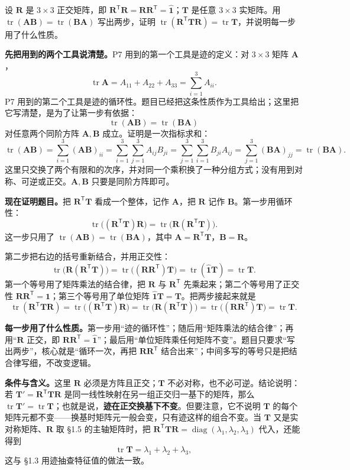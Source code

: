 \documentclass[11pt]{ctexart}
\newcommand{\ten}[1]{\mathbf{#1}}
\newcommand{\unitd}{\hat{\ten{1}}}
\newcommand{\tr}{\operatorname{tr}}
\begin{document}
{设 $\ten R$ 是 $3\times3$ 正交矩阵，即 $\ten R^{\mathsf T}\ten R=\ten R\ten R^{\mathsf T}=\unitd$；$\ten T$ 是任意 $3\times3$ 实矩阵。用 $\tr(\ten A\ten B)=\tr(\ten B\ten A)$ 写出两步，证明 $\tr(\ten R^{\mathsf T}\ten T\ten R)=\tr\ten T$，并说明每一步用了什么性质。}

\textbf{先把用到的两个工具说清楚。}P7 用到的第一个工具是迹的定义：对 $3\times3$ 矩阵 $\ten A$，
\[
\tr\ten A=A_{11}+A_{22}+A_{33}=\sum_{i=1}^{3}A_{ii}.
\]
P7 用到的第二个工具是迹的循环性。题目已经把这条性质作为工具给出；这里把它写清楚，是为了让第一步有依据：
\[
\tr(\ten A\ten B)=\tr(\ten B\ten A)
\]
对任意两个同阶方阵 $\ten A,\ten B$ 成立。证明是一次指标求和：
\[
\tr(\ten A\ten B)
=\sum_{i=1}^{3}(\ten A\ten B)_{ii}
=\sum_{i=1}^{3}\sum_{j=1}^{3}A_{ij}B_{ji}
=\sum_{j=1}^{3}\sum_{i=1}^{3}B_{ji}A_{ij}
=\sum_{j=1}^{3}(\ten B\ten A)_{jj}
=\tr(\ten B\ten A).
\]
这里只交换了两个有限和的次序，并对同一个乘积换了一种分组方式；没有用到对称、可逆或正交。$\ten A,\ten B$ 只要是同阶方阵即可。

\textbf{现在证明题目。}把 $\ten R^{\mathsf T}\ten T$ 看成一个整体，记作 $\ten A$，把 $\ten R$ 记作 $\ten B$。第一步用循环性：
\[
\tr\bigl((\ten R^{\mathsf T}\ten T)\ten R\bigr)
=\tr\bigl(\ten R(\ten R^{\mathsf T}\ten T)\bigr).
\]
这一步只用了 $\tr(\ten A\ten B)=\tr(\ten B\ten A)$，其中 $\ten A=\ten R^{\mathsf T}\ten T$，$\ten B=\ten R$。

第二步把右边的括号重新结合，并用正交性：
\[
\tr\bigl(\ten R(\ten R^{\mathsf T}\ten T)\bigr)
=\tr\bigl((\ten R\ten R^{\mathsf T})\ten T\bigr)
=\tr(\unitd\ten T)
=\tr\ten T .
\]
第一个等号用了矩阵乘法的结合律，把 $\ten R$ 与 $\ten R^{\mathsf T}$ 先乘起来；第二个等号用了正交性 $\ten R\ten R^{\mathsf T}=\unitd$；第三个等号用了单位矩阵 $\unitd\ten T=\ten T$。把两步接起来就是
\[
\tr(\ten R^{\mathsf T}\ten T\ten R)
=\tr\bigl((\ten R^{\mathsf T}\ten T)\ten R\bigr)
=\tr\bigl(\ten R(\ten R^{\mathsf T}\ten T)\bigr)
=\tr\bigl((\ten R\ten R^{\mathsf T})\ten T\bigr)
=\tr\ten T .
\]

\textbf{每一步用了什么性质。}第一步用“迹的循环性”；随后用“矩阵乘法的结合律”；再用“$\ten R$ 正交，即 $\ten R\ten R^{\mathsf T}=\unitd$”；最后用“单位矩阵乘任何矩阵不变”。题目只要求“写出两步”，核心就是“循环一次，再把 $\ten R\ten R^{\mathsf T}$ 结合出来”；中间多写的等号只是把结合律写细，不改变逻辑。

\textbf{条件与含义。}这里 $\ten R$ 必须是方阵且正交；$\ten T$ 不必对称，也不必可逆。结论说明：若 $\ten T'=\ten R^{\mathsf T}\ten T\ten R$ 是同一线性映射在另一组正交归一基下的矩阵，那么 $\tr\ten T'=\tr\ten T$；也就是说，\textbf{迹在正交换基下不变}。但要注意，它不说明 $\ten T$ 的每个矩阵元都不变——换基时矩阵元一般会变，只有迹这样的组合不变。当 $\ten T$ 又是实对称矩阵、$\ten R$ 取 \S1.5 的主轴矩阵时，把 $\ten R^{\mathsf T}\ten T\ten R=\operatorname{diag}(\lambda_1,\lambda_2,\lambda_3)$ 代入，还能得到
\[
\tr\ten T=\lambda_1+\lambda_2+\lambda_3,
\]
这与 \S1.3 用迹抽查特征值的做法一致。
\end{document}
